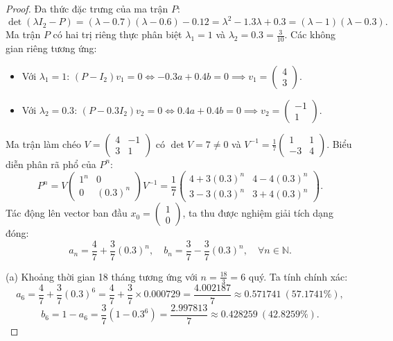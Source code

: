 \documentclass{article}
\begin{document}
\begin{proof}
	Đa thức đặc trưng của ma trận $P$:
	\begin{equation*}
		\det(\lambda I_2 - P) = (\lambda - 0.7)(\lambda - 0.6) - 0.12 = \lambda^2 - 1.3\lambda + 0.3 = (\lambda - 1)(\lambda - 0.3).
	\end{equation*}
	Ma trận $P$ có hai trị riêng thực phân biệt $\lambda_1 = 1$ và $\lambda_2 = 0.3 = \frac{3}{10}$. Các không gian riêng tương ứng:
	\begin{itemize}
		\item Với $\lambda_1 = 1$: $(P - I_2)v_1 = 0 \iff -0.3a + 0.4b = 0 \implies v_1 = \begin{pmatrix} 4 \\ 3 \end{pmatrix}$.
		\item Với $\lambda_2 = 0.3$: $(P - 0.3I_2)v_2 = 0 \iff 0.4a + 0.4b = 0 \implies v_2 = \begin{pmatrix} -1 \\ 1 \end{pmatrix}$.
	\end{itemize}
	Ma trận làm chéo $V = \begin{pmatrix} 4 & -1 \\ 3 & 1 \end{pmatrix}$ có $\det V = 7 \ne 0$ và $V^{-1} = \frac{1}{7}\begin{pmatrix} 1 & 1 \\ -3 & 4 \end{pmatrix}$. Biểu diễn phân rã phổ của $P^n$:
	\begin{equation*}
		P^n = V \begin{pmatrix} 1^n & 0 \\ 0 & (0.3)^n \end{pmatrix} V^{-1} = \frac{1}{7} \begin{pmatrix} 4 + 3(0.3)^n & 4 - 4(0.3)^n \\ 3 - 3(0.3)^n & 3 + 4(0.3)^n \end{pmatrix}.
	\end{equation*}
	Tác động lên vector ban đầu $x_0 = \begin{pmatrix} 1 \\ 0 \end{pmatrix}$, ta thu được nghiệm giải tích dạng đóng:
	\begin{equation*}
		a_n = \frac{4}{7} + \frac{3}{7}(0.3)^n, \quad b_n = \frac{3}{7} - \frac{3}{7}(0.3)^n, \quad \forall n \in \mathbb{N}.
	\end{equation*}
	
	(a) Khoảng thời gian 18 tháng tương ứng với $n = \frac{18}{3} = 6$ quý. Ta tính chính xác:
	\begin{equation*}
		a_6 = \frac{4}{7} + \frac{3}{7}(0.3)^6 = \frac{4}{7} + \frac{3}{7} \times 0.000729 = \frac{4.002187}{7} \approx 0.571741 \ (57.1741\%),
	\end{equation*}
	\begin{equation*}
		b_6 = 1 - a_6 = \frac{3}{7}(1 - 0.3^6) = \frac{2.997813}{7} \approx 0.428259 \ (42.8259\%).
	\end{equation*}
	

\end{proof}
\end{document}
